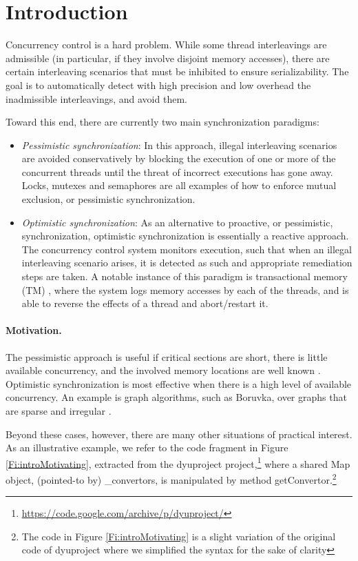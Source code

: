 \section{Introduction}\label{Se:intro}

Concurrency control is a hard problem. While some thread interleavings are admissible (in particular, if they involve disjoint memory accesses), there are certain interleaving scenarios that must be inhibited to ensure serializability. The goal is to automatically detect with high precision and low overhead the inadmissible interleavings, and avoid them.  

Toward this end, there are currently two main synchronization paradigms:
\begin{itemize}
	\item \textit{Pessimistic synchronization}: In this approach, illegal interleaving scenarios are avoided conservatively by blocking the execution of one or more of the concurrent threads until the threat of incorrect executions has gone away. Locks, mutexes and semaphores are all examples of how to enforce mutual exclusion, or pessimistic synchronization.
	\item \textit{Optimistic synchronization}: As an alternative to proactive, or pessimistic, synchronization, optimistic synchronization is essentially a reactive approach. The concurrency control system monitors execution, such that when an illegal interleaving scenario arises, it is detected as such and appropriate remediation steps are taken. A notable instance of this paradigm is transactional memory (TM) \cite{DBLP:conf/isca/HerlihyM93}, where the system logs memory accesses by each of the threads, and is able to reverse the effects of a thread and abort/restart it.
\end{itemize}

\paragraph{Motivation.} The pessimistic approach is useful if critical sections are short, there is little available concurrency, and the involved memory locations are well known \cite{AndiKleen}. Optimistic synchronization is most effective when there is a high level of available concurrency. An example is graph algorithms, such as Boruvka, over graphs that are sparse and irregular \cite{KulkarniGalois}.

Beyond these cases, however, there are many other situations of practical interest. As an illustrative example, we refer to the code fragment in Figure \ref{Fi:introMotivating}, extracted from the {\sf dyuproject} project,\footnote{\url{https://code.google.com/archive/p/dyuproject/}} where a shared {\sf Map} object, (pointed-to by) {\sf \_convertors}, is manipulated by method {\sf getConvertor}.\footnote{The code in Figure \ref{Fi:introMotivating} is a slight variation of the original code of {\sf dyuproject} where we simplified the syntax for the sake of clarity}

